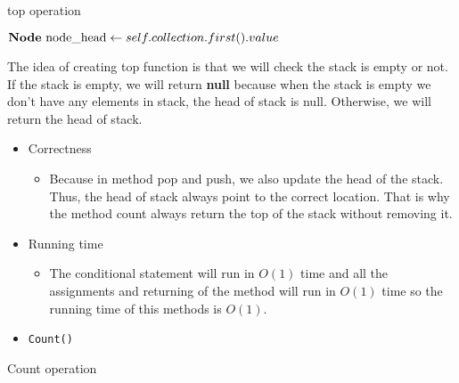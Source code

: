 \documentclass{article}
\begin{document}
	\begin{algorithm}[H]
		\caption{top operation}
		\label{top}
	\begin{algorithmic}[1]
			\State {} 
		\EndIf{}
		\State \(\text{\textbf{Node} node\_head} \gets self.collection.first().value\)
		\State {}
		\EndFunction{}
	\end{algorithmic}		
	\end{algorithm}

	The idea of creating top function is that we will check the stack is empty or not. If the stack is empty, we will return \textbf{null} because when the stack is empty we don't have any elements in stack, the head of stack is null. Otherwise, we will return the head of stack.

	\begin{itemize}
		\item Correctness
		\begin{itemize}
			\item Because in method pop and push, we also update the head of the stack. Thus, the head of stack always point to the correct location. That is why the method count always return the top of the stack without removing it.
		\end{itemize}
		\item Running time
		\begin{itemize}
			\item The conditional statement will run in \(O(1)\) time and all the assignments and returning of the method will run in \(O(1)\) time so the running time of this methods is \(O(1)\).
		\end{itemize}
	\end{itemize}





	\begin{itemize}
		\item \verb|Count()|
	\end{itemize}



	\begin{algorithm}[H]
		\caption{Count operation}
		\label{Count}
	\begin{algorithmic}[1]
		\State {}
		\EndFunction{}
	\end{algorithmic}		
	\end{algorithm}
\end{document}
